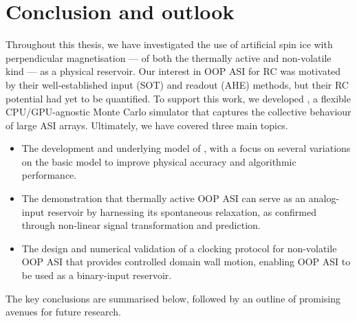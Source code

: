 \chapter{Conclusion and outlook}\label{ch:Conclusion}

Throughout this thesis, we have investigated the use of artificial spin ice with perpendicular magnetisation --- of both the thermally active and non-volatile kind --- as a physical reservoir.
Our interest in OOP ASI for RC was motivated by their well-established input (SOT) and readout (AHE) methods, but their RC potential had yet to be quantified.
To support this work, we developed \hotspice, a flexible CPU/GPU-agnostic Monte Carlo simulator that captures the collective behaviour of large ASI arrays.
Ultimately, we have covered three main topics.
\begin{itemize}
	\item The development and underlying model of \hotspice{}, with a focus on several variations on the basic model to improve physical accuracy and algorithmic performance.
	\item The demonstration that thermally active OOP ASI can serve as an analog-input reservoir by harnessing its spontaneous relaxation, as confirmed through non-linear signal transformation and prediction.
	\item The design and numerical validation of a clocking protocol for non-volatile OOP ASI that provides controlled domain wall motion, enabling OOP ASI to be used as a binary-input reservoir.
\end{itemize}
The key conclusions are summarised below, followed by an outline of promising avenues for future research.

\newpage
